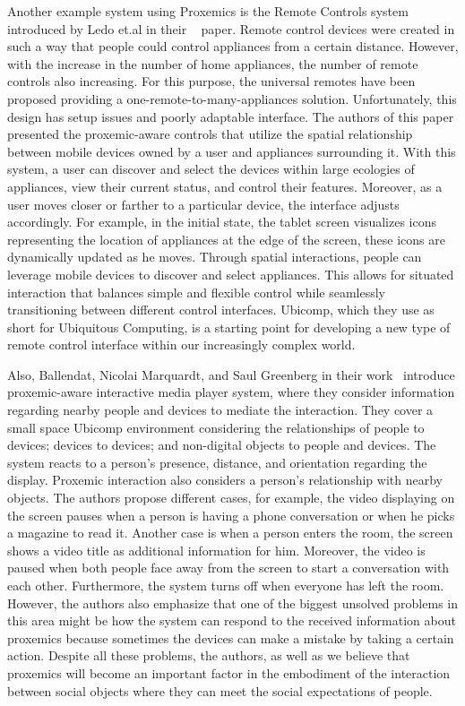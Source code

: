 Another example system using Proxemics is the Remote Controls system introduced by
Ledo et.al in their ~\cite{ledo2015proxemic} paper.
Remote control devices were created in such a way that people could
control appliances from a certain distance.
However, with the increase in the number of home appliances, the number of remote controls also increasing.
For this purpose, the universal remotes have been proposed providing a one-remote-to-many-appliances solution.
Unfortunately, this design has setup issues and poorly adaptable interface.
The authors of this paper presented the proxemic-aware controls that utilize the spatial relationship between
mobile devices owned by a user and appliances surrounding it.
With this system, a user can discover and select the devices within large ecologies of appliances,
view their current status, and control their features.
Moreover, as a user moves closer or farther to a particular device, the interface adjusts accordingly.
For example, in the initial state, the tablet screen visualizes icons representing the
location of appliances at the edge of the screen, these icons are dynamically updated as he moves.
Through spatial interactions, people can leverage mobile devices to discover and select appliances.
This allows for situated interaction that balances simple and flexible control while seamlessly
transitioning between different control interfaces.
Ubicomp, which they use as short for Ubiquitous Computing, is a starting point for
developing a new type of remote control interface within our increasingly complex world.

Also, Ballendat, Nicolai Marquardt, and Saul Greenberg in their
work~\cite{ballendat2010proxemic} introduce proxemic-aware interactive media player system,
where they consider information regarding nearby people and devices to mediate the interaction.
They cover a small space Ubicomp environment considering the relationships of people to devices;
devices to devices;
and non-digital objects to people and devices.
The system reacts to a person’s presence, distance, and orientation regarding the display.
Proxemic interaction also considers a person’s relationship with nearby objects.
The authors propose different cases, for example, the video displaying on the screen pauses
when a person is having a phone conversation or when he picks a magazine to read it.
Another case is when a person enters the room, the screen shows a video title as additional information for him.
Moreover, the video is paused when both people face away from the screen to start a conversation with each other.
Furthermore, the system turns off when everyone has left the room.
However, the authors also emphasize that one of the biggest unsolved
problems in this area might be how the system can respond to the received information about
proxemics because sometimes the devices can make a mistake by taking a certain action.
Despite all these problems, the authors, as well as we believe that proxemics will
become an important factor in the embodiment of the interaction between social objects
where they can meet the social expectations of people.

